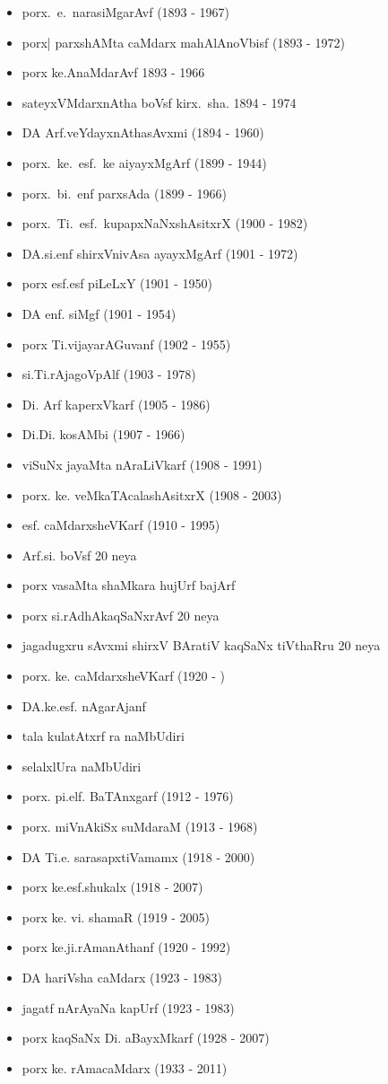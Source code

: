 {\begin{itemize}
\item porx.~e.~narasiMgarAvf {\rm (1893 - 1967)}
\item porx| parxshAMta caMdarx mahAlAnoVbisf {\rm (1893 - 1972)}
\item porx ke.AnaMdarAvf {\rm 1893 - 1966}
\item sateyxVMdarxnAtha boVsf kirx.~sha. {\rm 1894 - 1974}
\item DA Arf.veYdayxnAthasAvxmi {\rm (1894 - 1960)}
\item porx.~ke.~esf.~ke aiyayxMgArf {\rm (1899 - 1944)}
\item porx.~bi.~enf parxsAda {\rm (1899 - 1966)}
\item porx.~Ti.~esf.~kupapxNaNxshAsitxrX {\rm (1900 - 1982)}
\item DA.si.enf shirxVnivAsa ayayxMgArf {\rm (1901 - 1972)}
\item porx esf.esf piLeLxY {\rm (1901 - 1950)}
\item DA enf. siMgf {\rm (1901 - 1954)}
\item porx Ti.vijayarAGuvanf {\rm (1902 - 1955)}
\item si.Ti.rAjagoVpAlf {\rm (1903 - 1978)}
\item Di. Arf kaperxVkarf {\rm (1905 - 1986)}
\item Di.Di. kosAMbi {\rm (1907 - 1966)}
\item viSuNx jayaMta nAraLiVkarf {\rm (1908 - 1991)}
\item porx. ke. veMkaTAcalashAsitxrX {\rm (1908 - 2003)}
\item esf. caMdarxsheVKarf {\rm (1910 - 1995)}
\item Arf.si. boVsf {\rm 20} neya 
\item porx vasaMta shaMkara hujUrf bajArf
\item porx si.rAdhAkaqSaNxrAvf {\rm 20} neya
\item jagadugxru sAvxmi shirxV BAratiV kaqSaNx tiVthaRru {\rm 20} neya
\item porx. ke. caMdarxsheVKarf {\rm (1920 - )}
\item DA.ke.esf. nAgarAjanf
\item tala kulatAtxrf ra naMbUdiri
\item selalxlUra naMbUdiri
\item porx. pi.elf. BaTAnxgarf {\rm (1912 - 1976)}
\item porx. miVnAkiSx suMdaraM {\rm (1913 - 1968)}
\item DA Ti.e. sarasapxtiVamamx {\rm (1918 - 2000)}
\item porx ke.esf.shukalx {\rm (1918 - 2007)}
\item porx ke. vi.  shamaR {\rm (1919 - 2005)}
\item porx ke.ji.rAmanAthanf {\rm (1920 - 1992)}
\item DA hariVsha caMdarx {\rm (1923 - 1983)}
\item jagatf nArAyaNa kapUrf {\rm (1923 - 1983)}
\item porx kaqSaNx Di. aBayxMkarf {\rm (1928 - 2007)}
\item porx ke. rAmacaMdarx {\rm (1933 - 2011)}
\end{itemize}}


